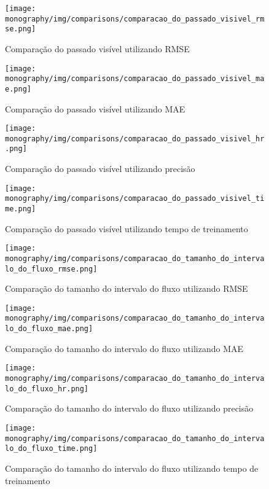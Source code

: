 \begin{figure}[htbp]
    \centering
    \texttt{[image: monography/img/comparisons/comparacao\_do\_passado\_visivel\_rmse.png]}
    \label{figure:passado_visivel_rmse}
    \caption{Comparação do passado visível utilizando RMSE}
\end{figure}

\begin{figure}[htbp]
    \centering
    \texttt{[image: monography/img/comparisons/comparacao\_do\_passado\_visivel\_mae.png]}
    \label{figure:passado_visivel_mae}
    \caption{Comparação do passado visível utilizando MAE}
\end{figure}

\begin{figure}[htbp]
    \centering
    \texttt{[image: monography/img/comparisons/comparacao\_do\_passado\_visivel\_hr.png]}
    \label{figure:passado_visivel_hr}
    \caption{Comparação do passado visível utilizando precisão}
\end{figure}

\begin{figure}[htbp]
    \centering
    \texttt{[image: monography/img/comparisons/comparacao\_do\_passado\_visivel\_time.png]}
    \label{figure:passado_visivel_time}
    \caption{Comparação do passado visível utilizando tempo de treinamento}
\end{figure}


\begin{figure}[htbp]
    \centering
    \texttt{[image: monography/img/comparisons/comparacao\_do\_tamanho\_do\_intervalo\_do\_fluxo\_rmse.png]}
    \label{figure:tamanho_do_intervalo_do_fluxo_rmse}
    \caption{Comparação do tamanho do intervalo do fluxo utilizando RMSE}
\end{figure}

\begin{figure}[htbp]
    \centering
    \texttt{[image: monography/img/comparisons/comparacao\_do\_tamanho\_do\_intervalo\_do\_fluxo\_mae.png]}
    \label{figure:tamanho_do_intervalo_do_fluxo_mae}
    \caption{Comparação do tamanho do intervalo do fluxo utilizando MAE}
\end{figure}

\begin{figure}[htbp]
    \centering
    \texttt{[image: monography/img/comparisons/comparacao\_do\_tamanho\_do\_intervalo\_do\_fluxo\_hr.png]}
    \label{figure:tamanho_do_intervalo_do_fluxo_hr}
    \caption{Comparação do tamanho do intervalo do fluxo utilizando precisão}
\end{figure}

\begin{figure}[htbp]
    \centering
    \texttt{[image: monography/img/comparisons/comparacao\_do\_tamanho\_do\_intervalo\_do\_fluxo\_time.png]}
    \label{figure:tamanho_do_intervalo_do_fluxo_time}
    \caption{Comparação do tamanho do intervalo do fluxo utilizando tempo de treinamento}
\end{figure}